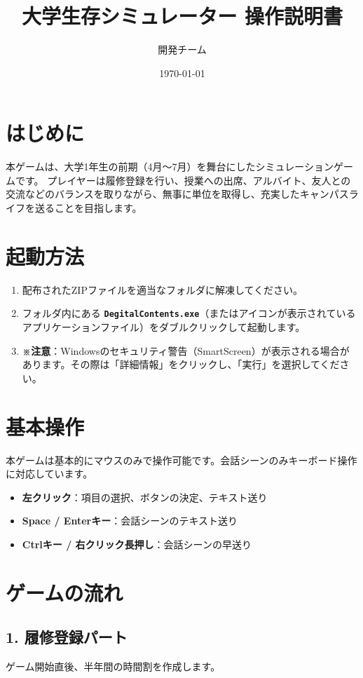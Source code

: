 \documentclass[a4paper,11pt]{ltjsarticle}
\title{\textbf{大学生存シミュレーター 操作説明書}}
\author{開発チーム}
\date{\today}
\begin{document}
\maketitle

\section{はじめに}
本ゲームは、大学1年生の前期（4月～7月）を舞台にしたシミュレーションゲームです。
プレイヤーは履修登録を行い、授業への出席、アルバイト、友人との交流などのバランスを取りながら、無事に単位を取得し、充実したキャンパスライフを送ることを目指します。

\section{起動方法}
\begin{enumerate}
    \item 配布されたZIPファイルを適当なフォルダに解凍してください。
    \item フォルダ内にある \textbf{\texttt{DegitalContents.exe}}（またはアイコンが表示されているアプリケーションファイル）をダブルクリックして起動します。
    \item \textbf{※注意}：Windowsのセキュリティ警告（SmartScreen）が表示される場合があります。その際は「詳細情報」をクリックし、「実行」を選択してください。
\end{enumerate}

\section{基本操作}
本ゲームは基本的にマウスのみで操作可能です。会話シーンのみキーボード操作に対応しています。

\begin{itemize}
    \item \textbf{左クリック}：項目の選択、ボタンの決定、テキスト送り
    \item \textbf{Space / Enterキー}：会話シーンのテキスト送り
    \item \textbf{Ctrlキー / 右クリック長押し}：会話シーンの早送り
\end{itemize}

\section{ゲームの流れ}

\subsection{1. 履修登録パート}
ゲーム開始直後、半年間の時間割を作成します。
\end{document}

